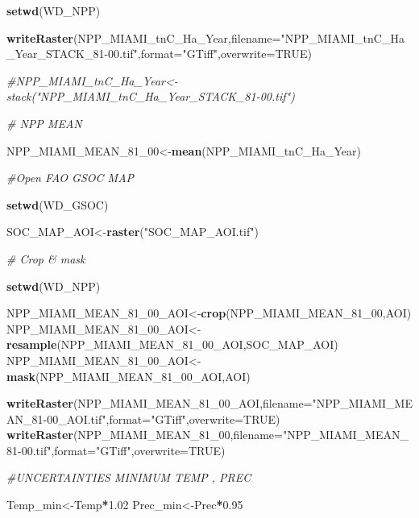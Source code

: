 \documentclass[
  10pt,
  b5paper,
]{book}
\newenvironment{Shaded}{\begin{snugshade}}{\end{snugshade}}
\newcommand{\CommentTok}[1]{\textcolor[rgb]{0.56,0.35,0.01}{\textit{#1}}}
\newcommand{\DataTypeTok}[1]{\textcolor[rgb]{0.13,0.29,0.53}{#1}}
\newcommand{\DecValTok}[1]{\textcolor[rgb]{0.00,0.00,0.81}{#1}}
\newcommand{\FloatTok}[1]{\textcolor[rgb]{0.00,0.00,0.81}{#1}}
\newcommand{\KeywordTok}[1]{\textcolor[rgb]{0.13,0.29,0.53}{\textbf{#1}}}
\newcommand{\NormalTok}[1]{#1}
\newcommand{\OperatorTok}[1]{\textcolor[rgb]{0.81,0.36,0.00}{\textbf{#1}}}
\newcommand{\OtherTok}[1]{\textcolor[rgb]{0.56,0.35,0.01}{#1}}
\newcommand{\StringTok}[1]{\textcolor[rgb]{0.31,0.60,0.02}{#1}}
\begin{document}
\begin{Shaded}
\begin{Highlighting}[]
\KeywordTok{setwd}\NormalTok{(WD_NPP)}

\KeywordTok{writeRaster}\NormalTok{(NPP_MIAMI_tnC_Ha_Year,}\DataTypeTok{filename=}\StringTok{"NPP_MIAMI_tnC_Ha_Year_STACK_81-00.tif"}\NormalTok{,}\DataTypeTok{format=}\StringTok{"GTiff"}\NormalTok{,}\DataTypeTok{overwrite=}\OtherTok{TRUE}\NormalTok{)}

\CommentTok{#NPP_MIAMI_tnC_Ha_Year<-stack("NPP_MIAMI_tnC_Ha_Year_STACK_81-00.tif")}

\CommentTok{# NPP MEAN}

\NormalTok{NPP_MIAMI_MEAN_}\DecValTok{81}\NormalTok{_}\DecValTok{00}\NormalTok{<-}\KeywordTok{mean}\NormalTok{(NPP_MIAMI_tnC_Ha_Year)}


\CommentTok{#Open FAO GSOC MAP }

\KeywordTok{setwd}\NormalTok{(WD_GSOC)}

\NormalTok{SOC_MAP_AOI<-}\KeywordTok{raster}\NormalTok{(}\StringTok{"SOC_MAP_AOI.tif"}\NormalTok{)}

\CommentTok{# Crop & mask}

\KeywordTok{setwd}\NormalTok{(WD_NPP)}

\NormalTok{NPP_MIAMI_MEAN_}\DecValTok{81}\NormalTok{_}\DecValTok{00}\NormalTok{_AOI<-}\KeywordTok{crop}\NormalTok{(NPP_MIAMI_MEAN_}\DecValTok{81}\NormalTok{_}\DecValTok{00}\NormalTok{,AOI)}
\NormalTok{NPP_MIAMI_MEAN_}\DecValTok{81}\NormalTok{_}\DecValTok{00}\NormalTok{_AOI<-}\KeywordTok{resample}\NormalTok{(NPP_MIAMI_MEAN_}\DecValTok{81}\NormalTok{_}\DecValTok{00}\NormalTok{_AOI,SOC_MAP_AOI)}
\NormalTok{NPP_MIAMI_MEAN_}\DecValTok{81}\NormalTok{_}\DecValTok{00}\NormalTok{_AOI<-}\KeywordTok{mask}\NormalTok{(NPP_MIAMI_MEAN_}\DecValTok{81}\NormalTok{_}\DecValTok{00}\NormalTok{_AOI,AOI)}

\KeywordTok{writeRaster}\NormalTok{(NPP_MIAMI_MEAN_}\DecValTok{81}\NormalTok{_}\DecValTok{00}\NormalTok{_AOI,}\DataTypeTok{filename=}\StringTok{"NPP_MIAMI_MEAN_81-00_AOI.tif"}\NormalTok{,}\DataTypeTok{format=}\StringTok{"GTiff"}\NormalTok{,}\DataTypeTok{overwrite=}\OtherTok{TRUE}\NormalTok{)}
\KeywordTok{writeRaster}\NormalTok{(NPP_MIAMI_MEAN_}\DecValTok{81}\NormalTok{_}\DecValTok{00}\NormalTok{,}\DataTypeTok{filename=}\StringTok{"NPP_MIAMI_MEAN_81-00.tif"}\NormalTok{,}\DataTypeTok{format=}\StringTok{"GTiff"}\NormalTok{,}\DataTypeTok{overwrite=}\OtherTok{TRUE}\NormalTok{)}


\CommentTok{#UNCERTAINTIES MINIMUM TEMP , PREC}

\NormalTok{Temp_min<-Temp}\OperatorTok{*}\FloatTok{1.02}
\NormalTok{Prec_min<-Prec}\OperatorTok{*}\FloatTok{0.95}


\end{Highlighting}
\end{Shaded}
\end{document}

